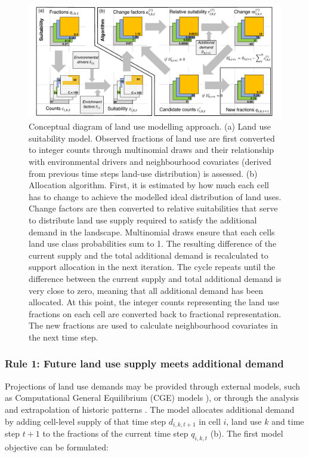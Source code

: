 \documentclass[titlesmallcaps,copyrightpage]{uomthesis}\usepackage[]{graphicx}\usepackage[]{color}
\begin{document}
\begin{figure}[htb]
  \centering
    \includegraphics[width=1\linewidth]{chapters/figures/chapter3/fig1.pdf} 
    \caption{Conceptual diagram of land use modelling approach. (a) Land use suitability model. Observed fractions of land use are first converted to integer counts through multinomial draws and their relationship with environmental drivers and neighbourhood covariates (derived from previous time steps land-use distribution) is assessed. (b) Allocation algorithm. First, it is estimated by how much each cell has to change to achieve the modelled ideal distribution of land uses. Change factors are then converted to relative suitabilities that serve to distribute land use supply required to satisfy the additional demand in the landscape. Multinomial draws ensure that each cells land use class probabilities sum to 1. The resulting difference of the current supply and the total additional demand is recalculated to support allocation in the next iteration. The cycle repeats until the difference between the current supply and total additional demand is very close to zero, meaning that all additional demand has been allocated. At this point, the integer counts representing the land use fractions on each cell are converted back to fractional representation. The new fractions are used to calculate neighbourhood covariates in the next time step.}
    \label{ch3:fig1}
\end{figure}

\subsubsection{Rule 1: Future land use supply meets additional demand}

Projections of land use demands may be provided through external models, such as Computational General Equilibrium (CGE) models \citep[i.e.~GTAP,][]{aguiar_overview_2016}), or through the analysis and extrapolation of historic patterns \citep{moulds_open_2015}. The model allocates additional demand by adding cell-level supply of that time step \(d_{i,k,t+1}\) in cell \(i\), land use \(k\) and time step \(t+1\) to the fractions of the current time step \(q_{i,k,t}\) (b). The first model objective can be formulated:
\end{document}
